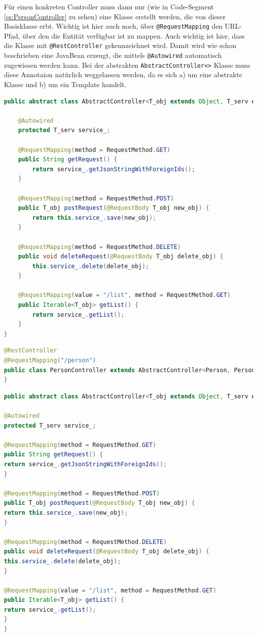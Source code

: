 Für einen konkreten Controller muss dann nur (wie in Code-Segment \ref{cs:PersonController} zu sehen) eine Klasse erstellt werden, die von dieser Basisklasse erbt. Wichtig ist hier auch noch, über \verb|@RequestMapping|  den URL-Pfad, über den die Entität verfügbar ist zu mappen. Auch wichtig ist hier, dass die Klasse mit \verb|@RestController| gekennzeichnet wird. Damit wird wie schon beschrieben eine JavaBean erzeugt, die mittels \verb|@Autowired| automatisch zugewiesen werden kann. Bei der abstrakten \verb|AbstractController<>| Klasse muss diese Annotaion natürlich weggelassen werden, da es sich a) um eine abstrakte Klasse und b) um ein Template handelt.

\scriptsize
\begin{lstlisting}[caption=AbstractController.java, label=cs:AbstractController, language=Java]
public abstract class AbstractController<T_obj extends Object, T_serv extends AbstractServiceInterface<T_obj>> {

	@Autowired
	protected T_serv service_;
	
	@RequestMapping(method = RequestMethod.GET)
	public String getRequest() {
		return service_.getJsonStringWithForeignIds();
	}
	
	@RequestMapping(method = RequestMethod.POST)
	public T_obj postRequest(@RequestBody T_obj new_obj) {
		return this.service_.save(new_obj);
	}
	
	@RequestMapping(method = RequestMethod.DELETE)
	public void deleteRequest(@RequestBody T_obj delete_obj) {
		this.service_.delete(delete_obj);
	}
	
	@RequestMapping(value = "/list", method = RequestMethod.GET)
	public Iterable<T_obj> getList() {
		return service_.getList();
	}
}
\end{lstlisting}

\begin{lstlisting}[caption=PersonController.java, label=cs:PersonController, language=Java]
@RestController
@RequestMapping("/person")
public class PersonController extends AbstractController<Person, PersonService>{
}
\end{lstlisting}
\normalsize

\scriptsize
\begin{lstlisting}[caption=AbstractController.java, label=cs:AbstractController, language=Java]
public abstract class AbstractController<T_obj extends Object, T_serv extends AbstractServiceInterface<T_obj>> {

@Autowired
protected T_serv service_;

@RequestMapping(method = RequestMethod.GET)
public String getRequest() {
return service_.getJsonStringWithForeignIds();
}

@RequestMapping(method = RequestMethod.POST)
public T_obj postRequest(@RequestBody T_obj new_obj) {
return this.service_.save(new_obj);
}

@RequestMapping(method = RequestMethod.DELETE)
public void deleteRequest(@RequestBody T_obj delete_obj) {
this.service_.delete(delete_obj);
}

@RequestMapping(value = "/list", method = RequestMethod.GET)
public Iterable<T_obj> getList() {
return service_.getList();
}
}
\end{lstlisting}
\normalsize

